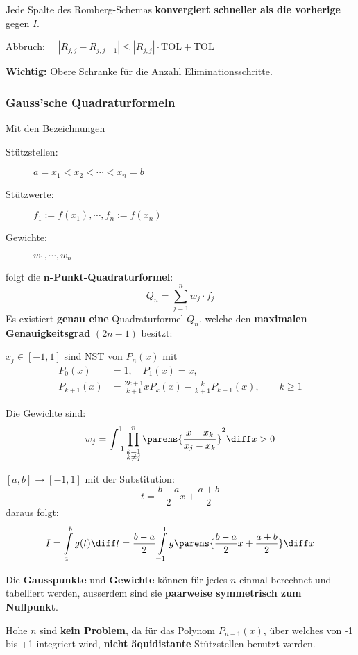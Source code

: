 			Jede Spalte des Romberg-Schemas \textbf{konvergiert schneller als die vorherige} gegen $I$.

			Abbruch: $\quad |R_{j,j}-R_{j,j-1}|\leq |R_{j,j}|\cdot \mathrm{TOL} + \mathrm{TOL}$

			\textbf{Wichtig:} Obere Schranke für die Anzahl Eliminationsschritte.

		\subsubsection{Gauss'sche Quadraturformeln}
			Mit den Bezeichnungen
			\begin{description}
				\item[Stützstellen:] $a= x_1 < x_2 < \cdots < x_n = b$
				\item[Stützwerte:] $f_1:=f(x_1), \cdots , f_n := f(x_n)$
				\item[Gewichte:] $w_1, \cdots, w_n$
			\end{description}
			folgt die \textbf{$\mathbf{n}$-Punkt-Quadraturformel}:
			\[
				Q_n = \sum_{j=1}^n w_j\cdot f_j
			\]
			Es existiert \textbf{genau eine} Quadraturformel $Q_n$, welche den \textbf{maximalen Genauigkeitsgrad} $(2n-1)$ besitzt:
			\begin{tightitemize}
				\item $x_j \in [-1,1]$ sind NST von $P_n(x)$ mit
					\begin{align*}
						P_0(x) &= 1, \quad P_1(x) = x, \\
						P_{k+1}(x) &= \frac{2k + 1}{k+1}xP_k(x) - \frac{k}{k+1}P_{k-1}(x), \qquad k\geq 1
					\end{align*}
				\item Die Gewichte sind:
					\[
						w_j = \int_{-1}^1 \prod_{\substack{
							k=1 \\ k \neq j
						}}^{n} \parens{ \frac{x-x_k}{x_j-x_k}}^2 \diff x> 0
					\]
				\item $[a,b] \to [-1,1]$ mit der Substitution:
					\[
						t= \frac{b-a}{2}x + \frac{a+b}{2}
					\]
					daraus folgt:
					\[
						I = \int\limits_a^b g(t) \diff t = \frac{b-a}{2}\int\limits_{-1}^1g \parens{ \frac{b-a}{2}x + \frac{a+b}{2}} \diff x
					\]
			\end{tightitemize}

			Die \textbf{Gausspunkte} und \textbf{Gewichte} können für jedes $n$ einmal berechnet und tabelliert werden, ausserdem sind sie \textbf{paarweise symmetrisch zum Nullpunkt}.

			Hohe $n$ sind \textbf{kein Problem}, da für das Polynom $P_{n-1}(x)$, über welches von -1 bis +1 integriert wird, \textbf{nicht äquidistante} Stützstellen benutzt werden.

